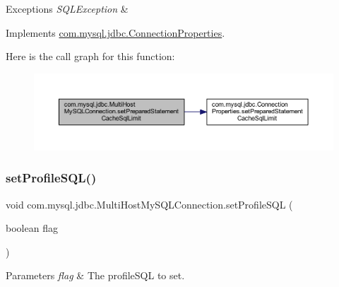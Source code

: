 \begin{DoxyExceptions}{Exceptions}
{\em S\+Q\+L\+Exception} & \\
\hline
\end{DoxyExceptions}


Implements \mbox{\hyperlink{interfacecom_1_1mysql_1_1jdbc_1_1_connection_properties_a7cf7fc262516d73e70ac5dbba0d6a510}{com.\+mysql.\+jdbc.\+Connection\+Properties}}.

Here is the call graph for this function\+:
\nopagebreak
\begin{figure}[H]
\begin{center}
\leavevmode
\includegraphics[width=350pt]{classcom_1_1mysql_1_1jdbc_1_1_multi_host_my_s_q_l_connection_aeab0c45eb21ae847d8275f48c9bf045b_cgraph}
\end{center}
\end{figure}
\mbox{\label{classcom_1_1mysql_1_1jdbc_1_1_multi_host_my_s_q_l_connection_a4cf77def253941b0c23f1ca26f9da972}} 
\subsubsection{\texorpdfstring{set\+Profile\+S\+Q\+L()}{setProfileSQL()}}
{\footnotesize\ttfamily void com.\+mysql.\+jdbc.\+Multi\+Host\+My\+S\+Q\+L\+Connection.\+set\+Profile\+S\+QL (\begin{DoxyParamCaption}\item[{boolean}]{flag }\end{DoxyParamCaption})}


\begin{DoxyParams}{Parameters}
{\em flag} & The profile\+S\+QL to set. \\
\hline
\end{DoxyParams}


